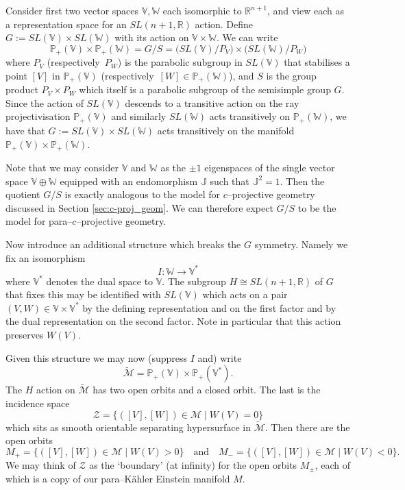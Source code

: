 Consider first two vector spaces $\mathbb{V},\mathbb{W}$ each isomorphic to $\mathbb{R}^{n+1}$, and view each as a representation space for an $SL(n+1,\mathbb{R})$ action. Define $G:= SL(\mathbb{V})\times SL(\mathbb{W})$ with its action on $\mathbb{V}\times \mathbb{W}$. We can write 
\[
\mathbb{P}_+(\mathbb{V}) \times \mathbb{P}_+(\mathbb{W})=G/S=\big( SL(\mathbb{V})/P_V \big)\times \big( SL(\mathbb{W})/P_W \big)
\]
where $P_V$ (respectively\ $P_W$) is the parabolic subgroup in $SL(\mathbb{V})$
that stabilises a point $[V]$ in $\mathbb{P}_+(\mathbb{V})$ (respectively\ $[W] \in \mathbb{P}_+(\mathbb{W})$), and $S$ is the group product $P_V\times P_W$ which itself is a
parabolic subgroup of the semisimple group $G$.
Since the action of $SL(\mathbb{V})$ descends to a transitive action on the ray projectivisation $\mathbb{P}_+(\mathbb{V})$ and similarly $SL(\mathbb{W})$ acts
transitively on $\mathbb{P}_+(\mathbb{W})$, we have that $G:= SL(\mathbb{V})\times SL(\mathbb{W})$ acts transitively on the manifold $\mathbb{P}_+(\mathbb{V}) \times \mathbb{P}_+(\mathbb{W})$.

Note that we may consider $\mathbb{V}$ and $\mathbb{W}$ as the $\pm 1$ eigenspaces of the single vector space $\mathbb{V}\oplus \mathbb{W}$ equipped with an endomorphism
$\mathbb{J}$ such that $\mathbb{J}^2=1$. Then the quotient $G/S$ is exactly analogous to the model for $c$--projective geometry discussed in Section \ref{sec:c-proj_geom}. We can therefore expect $G/S$ to be the model for para--$c$--projective geometry.


Now introduce an additional structure which breaks the $G$
symmetry. 
Namely we fix an isomorphism
$$
I:\mathbb{W}\to \mathbb{V}^*
$$
where $\mathbb{V}^*$ denotes the dual space to $\mathbb{V}$. The subgroup $H\cong SL(n+1,\mathbb{R})$ of $G$
that fixes this may be identified with $SL(\mathbb{V})$ which acts on a pair
$(V,W)\in \mathbb{V}\times \mathbb{V}^*$ by the defining representation and on the first
factor and by the dual representation on the second factor. Note in particular that this action preserves $W(V)$.

Given this structure we may now (suppress $I$ and) write
$$
\widetilde{\mathcal{M}}= \mathbb{P}_+(\mathbb{V}) \times \mathbb{P}_+(\mathbb{V}^*).
$$
The ${H}$ action on $\widetilde{\mathcal{M}}$ has two open orbits and a closed orbit. The last
is the incidence space 
$$
\mathcal{Z}=\{ ([V],[W])\in \mathcal{M} \mid W(V)=0 \} 
$$
which sits as smooth orientable separating hypersurface in $\widetilde{\mathcal{M}}$. Then there are the open orbits
$$
M_+=\{ ([V],[W])\in \mathcal{M} \mid W(V)>0 \} \quad \mbox{and} \quad
M_-=\{ ([V],[W])\in \mathcal{M} \mid W(V)<0 \}.
$$
We may think of $\mathcal{Z}$ as the `boundary' (at infinity) for the open orbits $M_\pm$, each of which is a copy of our para--K\"ahler Einstein manifold $M$.


